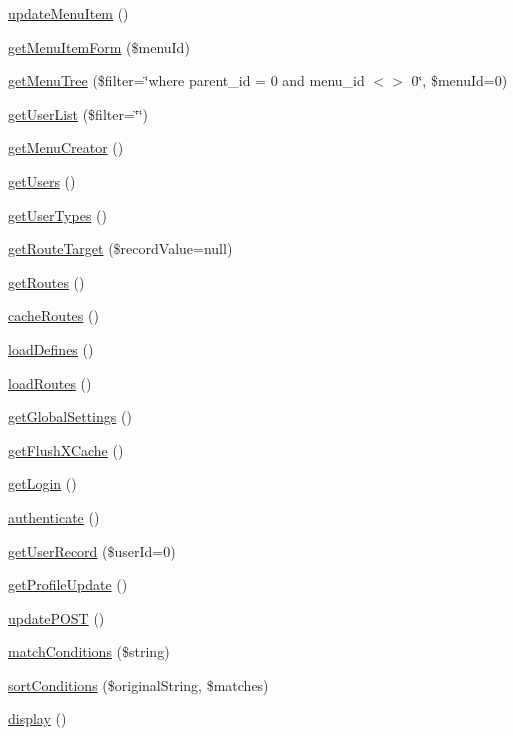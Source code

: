 \begin{DoxyCompactItemize}
\item 
\hyperlink{classKim_a1c8f6358dbec4612dd880ae09cb4a74e}{update\+Menu\+Item} ()
\item 
\hyperlink{classKim_a2a73684a878eac950d34f15ce674f194}{get\+Menu\+Item\+Form} (\$menu\+Id)
\item 
\hyperlink{classKim_acb9933ffdc95c3caab1c94c47d5f4e13}{get\+Menu\+Tree} (\$filter=\char`\"{}where parent\+\_\+id = 0 and menu\+\_\+id $<$$>$ 0\char`\"{}, \$menu\+Id=0)
\item 
\hyperlink{classKim_afce7f678a883aab27b976429e8248d79}{get\+User\+List} (\$filter=\char`\"{}\char`\"{})
\item 
\hyperlink{classKim_a0fb70ab1aedbf3be92bfdd9241944e6b}{get\+Menu\+Creator} ()
\item 
\hyperlink{classKim_a31a5796278c813534e76d2ce91d9eed2}{get\+Users} ()
\item 
\hyperlink{classKim_a03d8b762e1c6d458e714904cd8b02dd6}{get\+User\+Types} ()
\item 
\hyperlink{classKim_a8ed17935db3df4dfc01b2b26d47ebc4e}{get\+Route\+Target} (\$record\+Value=null)
\item 
\hyperlink{classKim_a1e3ce6c13bf4c0b488ff07ddfe95c0ac}{get\+Routes} ()
\item 
\hyperlink{classKim_a5fcd3a64ecd0f244e9db70f0c007b6ba}{cache\+Routes} ()
\item 
\hyperlink{classKim_a8a657ebf9637c9d007c2c66654bf2a6d}{load\+Defines} ()
\item 
\hyperlink{classKim_a99011f068ed5a1f55fd8c5cf2b1aac43}{load\+Routes} ()
\item 
\hyperlink{classKim_a2bcf75443f82b5c8f49b4e82bdcab94d}{get\+Global\+Settings} ()
\item 
\hyperlink{classKim_a54e4f46e005a09de5bda3a2093a86af7}{get\+Flush\+X\+Cache} ()
\item 
\hyperlink{classKim_a7531e4d2f4da4cb34176d40d20ee6401}{get\+Login} ()
\item 
\hyperlink{classKim_abfaef7d8d59b67ed50d46053b0154b1d}{authenticate} ()
\item 
\hyperlink{classKim_a6c3ce83f2f3bc3c7743f1bfa46f30d0e}{get\+User\+Record} (\$user\+Id=0)
\item 
\hyperlink{classKim_acbae7ab945d82706b2be25816578ae71}{get\+Profile\+Update} ()
\item 
\hyperlink{classKim_a3725ce24c9501992a03e6386423e447c}{update\+P\+O\+S\+T} ()
\item 
\hyperlink{classKim_a06415955f55535b121470e7779e92168}{match\+Conditions} (\$string)
\item 
\hyperlink{classKim_a3fe85e0bf7c92053e0a4c3b76dba7259}{sort\+Conditions} (\$original\+String, \$matches)
\item 
\hyperlink{classKim_ae017a30aaa5b1f6e470de679142b7f02}{display} ()
\end{DoxyCompactItemize}
